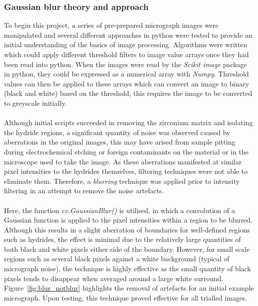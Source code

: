 \documentclass{article}
\begin{document}
	\subsubsection{Gaussian blur theory and approach}
	To begin this project, a series of pre-prepared micrograph images were manipulated and several different approaches in python were tested to provide an initial understanding of the basics of image processing. Algorithms were written which could apply different threshold filters to image value arrays once they had been read into python. When the images were read by the \textit{Scikit image} package in python, they could be expressed as a numerical array with \textit{Numpy}. Threshold values can then be applied to these arrays which can convert an image to binary (black and white) based on the threshold, this requires the image to be converted to greyscale initially.
	\\
	\\
	Although initial scripts succeeded in removing the zirconium matrix and isolating the hydride regions, a significant quantity of noise was observed caused by aberrations in the original images, this may have arised from sample pitting during electrochemical etching or foreign contaminants on the material or in the microscope used to take the image. As these aberrations manifested at similar pixel intensities to the hydrides themselves, filtering techniques were not able to eliminate them. Therefore, a \textit{blurring} technique was applied prior to intensity filtering in an attempt to remove the noise artefacts.
	\\
	\\
	Here, the function \textit{cv.GaussianBlur()} is utilised, in which a convolution of a Gaussian function is applied to the pixel intensities within a region to be blurred. Although this results in a slight aberration of boundaries for well-defined regions such as hydrides, the effect is minimal due to the relatively large quantities of both black and white pixels either side of the boundary. However, for small scale regions such as several black pixels against a white background (typical of micrograph noise), the technique is highly effective as the small quantity of black pixels tends to disappear when averaged around a large white surround. Figure~\ref{fig:blur_notblur} highlights the removal of artefacts for an initial example micrograph. Upon testing, this technique proved effective for all trialled images.
    
\end{document}
